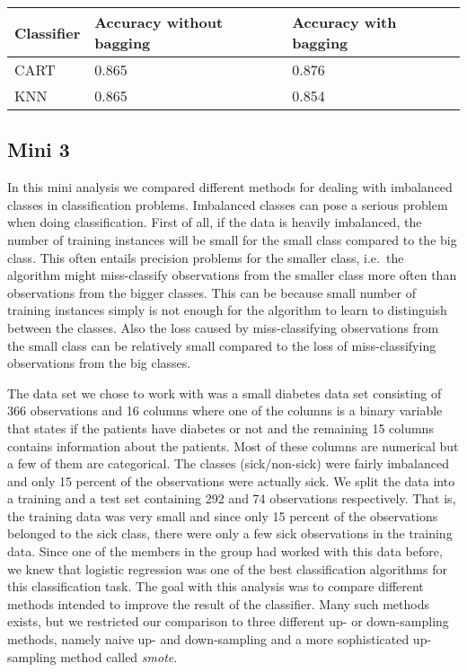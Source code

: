 \documentclass[11pt,twoside,swedish]{article}
\begin{document}
\begin{table}
\begin{center}
\begin{tabular}{ l | l l}
 Classifier & Accuracy without bagging & Accuracy with bagging \\ 
 \hline
 CART & 0.865 & 0.876 \\
 KNN & 0.865 & 0.854\\
\end{tabular}
\end{center}
\label{titanic bagging}
\end{table}



\subsection{Mini 3}\label{Mini 3}
In this mini analysis we compared different methods for dealing with
imbalanced classes in classification problems. Imbalanced classes can
pose a serious problem when doing classification. First of all, if the
data is heavily imbalanced, the number of training instances will be
small for the small class compared to the big class. This often
entails precision problems for the smaller class, i.e.\ the algorithm
might miss-classify observations from the smaller class more often
than observations from the bigger classes. This can be because small
number of training instances simply is not enough for the algorithm to
learn to distinguish between the classes. Also the loss caused by
miss-classifying observations from the small class can be relatively
small compared to the loss of miss-classifying observations from the
big classes.

The data set we chose to work with was a small diabetes data set consisting of
366 observations and 16 columns where one of the columns is a binary
variable that states if the patients have diabetes or not and the
remaining 15 columns contains information about the
patients. Most of these columns are numerical but a few of them are
categorical. The classes (sick/non-sick) were fairly imbalanced and only
15 percent of the observations were actually sick. We split the data
into a training and a test set containing 292 and 74 observations
respectively. That is, the training data was very small and since only
15 percent of the observations belonged to the sick class, there were
only a few sick observations in the training data. Since one of the members in
the group had worked with this data before, we knew that logistic
regression was one of the best classification algorithms for this
classification task. The goal with this analysis was to compare
different methods intended to improve the result of the
classifier. Many such methods exists, but we restricted our comparison
to three different up- or down-sampling methods, namely naive up- and
down-sampling and a more sophisticated up-sampling method called
\emph{smote}.
\end{document}
